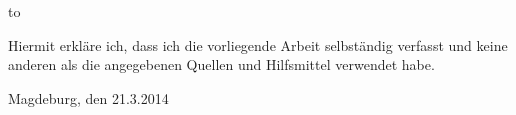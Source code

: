 \thispagestyle{empty}
\vspace*{38\baselineskip}
\hbox to \textwidth{\hrulefill}
\par
Hiermit erkl\"are ich, dass ich die vorliegende Arbeit selbst\"andig verfasst und
keine anderen als die angegebenen Quellen und Hilfsmittel verwendet habe.

Magdeburg, den 21.3.2014

\clearpage
